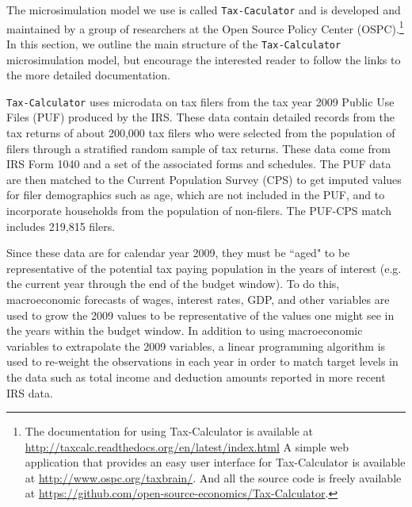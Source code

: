 \documentclass[letterpaper,12pt]{article}
\theoremstyle{definition}
\begin{document}
\begin{spacing}{1.5}
  The microsimulation model we use is called \texttt{Tax-Caculator} and is developed and maintained by a group of researchers at the Open Source Policy Center (OSPC).\footnote{The documentation for using Tax-Calculator is available at \href{http://taxcalc.readthedocs.org/en/latest/index.html}{http://taxcalc.readthedocs.org/en/latest/index.html} A simple web application that provides an easy user interface for Tax-Calculator is available at \href{http://www.ospc.org/taxbrain/}{http://www.ospc.org/taxbrain/}. And all the source code is freely available at \href{https://github.com/open-source-economics/Tax-Calculator}{https://github.com/open-source-economics/Tax-Calculator}.} In this section, we outline the main structure of the \texttt{Tax-Calculator} microsimulation model, but encourage the interested reader to follow the links to the more detailed documentation.

  \texttt{Tax-Calculator} uses microdata on tax filers from the tax year 2009 Public Use Files (PUF) produced by the IRS. These data contain detailed records from the tax returns of about 200,000 tax filers who were selected from the population of filers through a stratified random sample of tax returns. These data come from IRS Form 1040 and a set of the associated forms and schedules. The PUF data are then matched to the Current Population Survey (CPS) to get imputed values for filer demographics such as age, which are not included in the PUF, and to incorporate households from the population of non-filers. The PUF-CPS match includes 219,815 filers.

  Since these data are for calendar year 2009, they must be ``aged" to be representative of the potential tax paying population in the years of interest (e.g. the current year through the end of the budget window).  To do this, macroeconomic forecasts of wages, interest rates, GDP, and other variables are used to grow the 2009 values to be representative of the values one might see in the years within the budget window. In addition to using macroeconomic variables to extrapolate the 2009 variables, a linear programming algorithm is used to re-weight the observations in each year in order to match target levels in the data such as total income and deduction amounts reported in more recent IRS data.


\end{spacing}
\end{document}

